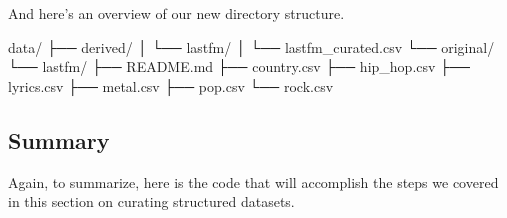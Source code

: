 \documentclass[
  letterpaper,
  DIV=11,
  numbers=noendperiod]{scrreport}
\newenvironment{Shaded}{\begin{snugshade}}{\end{snugshade}}
\newcommand{\ExtensionTok}[1]{\textcolor[rgb]{0.00,0.00,0.00}{#1}}
\newcommand{\NormalTok}[1]{\textcolor[rgb]{0.00,0.00,0.00}{#1}}
\theoremstyle{definition}
\theoremstyle{remark}
\begin{document}
And here's an overview of our new directory structure.

\begin{Shaded}
\begin{Highlighting}[]
\ExtensionTok{data/}
\ExtensionTok{├──}\NormalTok{ derived/}
\ExtensionTok{│}\NormalTok{   └── lastfm/}
\ExtensionTok{│}\NormalTok{       └── lastfm\_curated.csv}
\ExtensionTok{└──}\NormalTok{ original/}
    \ExtensionTok{└──}\NormalTok{ lastfm/}
        \ExtensionTok{├──}\NormalTok{ README.md}
        \ExtensionTok{├──}\NormalTok{ country.csv}
        \ExtensionTok{├──}\NormalTok{ hip\_hop.csv}
        \ExtensionTok{├──}\NormalTok{ lyrics.csv}
        \ExtensionTok{├──}\NormalTok{ metal.csv}
        \ExtensionTok{├──}\NormalTok{ pop.csv}
        \ExtensionTok{└──}\NormalTok{ rock.csv}
\end{Highlighting}
\end{Shaded}

\hypertarget{summary-6}{%
\subsection{Summary}\label{summary-6}}

Again, to summarize, here is the code that will accomplish the steps we
covered in this section on curating structured datasets.
\end{document}
